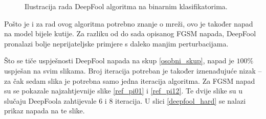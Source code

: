 \documentclass[utf8, diplomski]{fer}
\begin{document}
\begin{figure}[H]
  \centering
  \hfill
  \caption{Ilustracija rada DeepFool algoritma na binarnim klasifikatorima.}
\end{figure}\label{fig:deepfool_illustrations}

Pošto je i za rad ovog algoritma potrebno znanje o mreži, ovo je također napad na model bijele kutije. Za razliku od do sada opisanog FGSM napada, DeepFool pronalazi bolje neprijateljske primjere s daleko manjim perturbacijama. \par
Što se tiče uspješnosti DeepFool napada na skup \ref{osobni_skup}, napad je $100\%$ uspješan na svim slikama. Broj iteracija potreban je također iznenađujuće nizak -- za čak sedam slika je potrebna samo jedna iteracija algoritma. Za FGSM napad su se pokazale najzahtjevnije slike \ref{ref_pi01} i \ref{ref_pi12}. Te dvije slike su u slučaju DeepFoola zahtijevale 6 i 8 iteracija. U slici \ref{deepfool_hard} se nalazi prikaz napada na te slike. 
\end{document}
